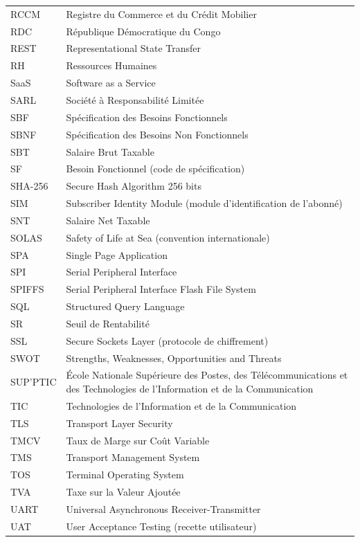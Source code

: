 \begin{longtable}{@{}p{3.2cm}p{11.4cm}@{}}
	RCCM & Registre du Commerce et du Crédit Mobilier \\
	RDC & République Démocratique du Congo \\
	REST & Representational State Transfer \\
	RH & Ressources Humaines \\
	SaaS & Software as a Service \\
	SARL & Société à Responsabilité Limitée \\
	SBF & Spécification des Besoins Fonctionnels \\
	SBNF & Spécification des Besoins Non Fonctionnels \\
	SBT & Salaire Brut Taxable \\
	SF & Besoin Fonctionnel (code de spécification) \\
	SHA-256 & Secure Hash Algorithm 256 bits \\
	SIM & Subscriber Identity Module (module d'identification de l'abonné) \\
	SNT & Salaire Net Taxable \\
	SOLAS & Safety of Life at Sea (convention internationale) \\
	SPA & Single Page Application \\
	SPI & Serial Peripheral Interface \\
	SPIFFS & Serial Peripheral Interface Flash File System \\
	SQL & Structured Query Language \\
	SR & Seuil de Rentabilité \\
	SSL & Secure Sockets Layer (protocole de chiffrement) \\
	SWOT & Strengths, Weaknesses, Opportunities and Threats \\
	SUP'PTIC & École Nationale Supérieure des Postes, des Télécommunications et des Technologies de l'Information et de la Communication \\
	TIC & Technologies de l'Information et de la Communication \\
	TLS & Transport Layer Security \\
	TMCV & Taux de Marge sur Coût Variable \\
	TMS & Transport Management System \\
	TOS & Terminal Operating System \\
	TVA & Taxe sur la Valeur Ajoutée \\
	UART & Universal Asynchronous Receiver-Transmitter \\
	UAT & User Acceptance Testing (recette utilisateur) \\

\end{longtable}
